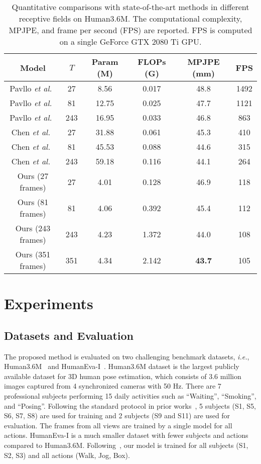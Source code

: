 \documentclass[journal]{IEEEtran}
\begin{document}
\begin{table}[ht]
   \centering
   \caption
   { 
      Quantitative comparisons with state-of-the-art methods in different receptive fields on Human3.6M. 
      The computational complexity, MPJPE, and frame per second (FPS) are reported. 
      FPS is computed on a single GeForce GTX 2080 Ti GPU.
   }  
   \setlength{\tabcolsep}{1.10mm} 
   \begin{tabular}{cccccc}
   \toprule [1pt]
   Model &$T$ &Param (M) &FLOPs (G) &MPJPE (mm) &FPS \\
   \midrule [0.5pt]  
   Pavllo \emph{et al.}~\cite{pavllo20193d} &27 &8.56 &0.017 &48.8 &1492 \\
   Pavllo \emph{et al.}~\cite{pavllo20193d} &81 &12.75 &0.025 &47.7 &1121 \\
   Pavllo \emph{et al.}~\cite{pavllo20193d} &243 &16.95 &0.033 &46.8 &863 \\
   Chen \emph{et al.}~\cite{chen2021anatomy} &27 &31.88 &0.061 &45.3 &410 \\
   Chen \emph{et al.}~\cite{chen2021anatomy} &81 &45.53 &0.088  &44.6 &315 \\
   Chen \emph{et al.}~\cite{chen2021anatomy} &243 &59.18 &0.116 &44.1 &264 \\
   \midrule [0.5pt]

   Ours (27 frames) &27 &4.01 &0.128 &46.9 &118 \\
   Ours (81 frames) &81 &4.06 &0.392 &45.4 &112 \\
   Ours (243 frames) &243 &4.23 &1.372 &44.0 &108 \\
   Ours (351 frames) &351 &4.34 &2.142 &\textbf{43.7} &105 \\

   \toprule [1pt]
   \end{tabular}
   \label{table:compare}
\end{table}

\section{Experiments}
\subsection{Datasets and Evaluation}
The proposed method is evaluated on two challenging benchmark datasets, \emph{i.e.}, Human3.6M~\cite{ionescu2013human3} and HumanEva-I~\cite{sigal2010humaneva}. 
Human3.6M dataset is the largest publicly available dataset for 3D human pose estimation, which consists of 3.6 million images captured from 4 synchronized cameras with 50 Hz. 
There are 7 professional subjects performing 15 daily activities such as “Waiting”, “Smoking”, and “Posing”.
Following the standard protocol in prior works~\cite{chen2019weakly,tome2018rethinking,pavllo20193d}, 5 subjects (S1, S5, S6, S7, S8) are used for training and 2 subjects (S9 and S11) are used for evaluation. 
The frames from all views are trained by a single model for all actions. 
HumanEva-I is a much smaller dataset with fewer subjects and actions compared to Human3.6M. 
Following~\cite{pavllo20193d,lee2018propagating}, our model is trained for all subjects (S1, S2, S3) and all actions (Walk, Jog, Box). 
\end{document}
